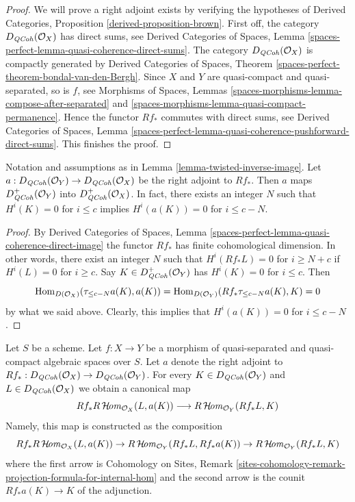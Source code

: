 \begin{proof}
We will prove a right adjoint exists by verifying the hypotheses of
Derived Categories, Proposition \ref{derived-proposition-brown}.
First off, the category $D_{\mathit{QCoh}}(\mathcal{O}_X)$ has direct sums, see
Derived Categories of Spaces, Lemma
\ref{spaces-perfect-lemma-quasi-coherence-direct-sums}.
The category $D_{\mathit{QCoh}}(\mathcal{O}_X)$ is compactly generated by
Derived Categories of Spaces, Theorem
\ref{spaces-perfect-theorem-bondal-van-den-Bergh}.
Since $X$ and $Y$ are quasi-compact and quasi-separated, so is $f$, see
Morphisms of Spaces, Lemmas
\ref{spaces-morphisms-lemma-compose-after-separated} and
\ref{spaces-morphisms-lemma-quasi-compact-permanence}.
Hence the functor $Rf_*$ commutes with direct sums, see
Derived Categories of Spaces, Lemma
\ref{spaces-perfect-lemma-quasi-coherence-pushforward-direct-sums}.
This finishes the proof.
\end{proof}

\begin{lemma}
\label{lemma-twisted-inverse-image-bounded-below}
Notation and assumptions as in Lemma \ref{lemma-twisted-inverse-image}.
Let $a : D_{\mathit{QCoh}}(\mathcal{O}_Y) \to D_{\mathit{QCoh}}(\mathcal{O}_X)$ be the right
adjoint to $Rf_*$. Then $a$ maps
$D^+_{\mathit{QCoh}}(\mathcal{O}_Y)$ into $D^+_{\mathit{QCoh}}(\mathcal{O}_X)$.
In fact, there exists an integer $N$ such that
$H^i(K) = 0$ for $i \leq c$ implies $H^i(a(K)) = 0$ for $i \leq c - N$.
\end{lemma}

\begin{proof}
By Derived Categories of Spaces, Lemma
\ref{spaces-perfect-lemma-quasi-coherence-direct-image}
the functor $Rf_*$ has finite cohomological dimension. In other words,
there exist an integer $N$ such that
$H^i(Rf_*L) = 0$ for $i \geq N + c$ if $H^i(L) = 0$ for $i \geq c$.
Say $K \in D^+_{\mathit{QCoh}}(\mathcal{O}_Y)$ has $H^i(K) = 0$ for $i \leq c$.
Then
$$
\mathop{\mathrm{Hom}}\nolimits_{D(\mathcal{O}_X)}(\tau_{\leq c - N}a(K), a(K)) =
\mathop{\mathrm{Hom}}\nolimits_{D(\mathcal{O}_Y)}(Rf_*\tau_{\leq c - N}a(K), K) = 0
$$
by what we said above. Clearly, this implies that
$H^i(a(K)) = 0$ for $i \leq c - N$.
\end{proof}

\noindent
Let $S$ be a scheme.
Let $f : X \to Y$ be a morphism of quasi-separated and quasi-compact
algebraic spaces over $S$.
Let $a$ denote the right adjoint to
$Rf_* : D_{\mathit{QCoh}}(\mathcal{O}_X) \to D_{\mathit{QCoh}}(\mathcal{O}_Y)$. For every
$K \in D_{\mathit{QCoh}}(\mathcal{O}_Y)$ and $L \in D_{\mathit{QCoh}}(\mathcal{O}_X)$
we obtain a canonical map
\begin{equation}
\label{equation-sheafy-trace}
Rf_*R\mathop{\mathcal{H}\!\mathit{om}}\nolimits_{\mathcal{O}_X}(L, a(K))
\longrightarrow
R\mathop{\mathcal{H}\!\mathit{om}}\nolimits_{\mathcal{O}_Y}(Rf_*L, K)
\end{equation}
Namely, this map is constructed as the composition
$$
Rf_*R\mathop{\mathcal{H}\!\mathit{om}}\nolimits_{\mathcal{O}_X}(L, a(K)) \to
R\mathop{\mathcal{H}\!\mathit{om}}\nolimits_{\mathcal{O}_Y}(Rf_*L, Rf_*a(K)) \to
R\mathop{\mathcal{H}\!\mathit{om}}\nolimits_{\mathcal{O}_Y}(Rf_*L, K)
$$
where the first arrow is 
Cohomology on Sites, Remark
\ref{sites-cohomology-remark-projection-formula-for-internal-hom}
and the second arrow is the counit $Rf_*a(K) \to K$ of the adjunction.

